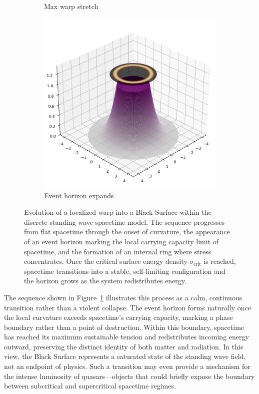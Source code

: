 \documentclass[12pt]{article}
\begin{document}
\begin{figure}[H]
\begin{subfigure}[b]{0.3\textwidth}
    \caption{Max warp stretch}
  \end{subfigure}
  \hfill
  \begin{subfigure}[b]{0.3\textwidth}
    \includegraphics[width=\textwidth]{eh_grows.pdf}
    \caption{Event horizon expands}
  \end{subfigure}

\caption{Evolution of a localized warp into a Black Surface within the discrete standing wave spacetime model. The sequence progresses from flat spacetime through the onset of curvature, the appearance of an event horizon marking the local carrying capacity limit of spacetime, and the formation of an internal ring where stress concentrates. Once the critical surface energy density $\sigma_{\text{crit}}$ is reached, spacetime transitions into a stable, self-limiting configuration and the horizon grows as the system redistributes energy.}
 \label{fig:black_surface_stages}
\end{figure}

\noindent
The sequence shown in Figure~\ref{fig:black_surface_stages} illustrates this process as a calm, continuous transition rather than a violent collapse. The event horizon forms naturally once the local curvature exceeds spacetime’s carrying capacity, marking a phase boundary rather than a point of destruction. Within this boundary, spacetime has reached its maximum sustainable tension and redistributes incoming energy outward, preserving the distinct identity of both matter and radiation. In this view, the Black Surface represents a saturated state of the standing wave field, not an endpoint of physics. Such a transition may even provide a mechanism for the intense luminosity of quasars---objects that could briefly expose the boundary between subcritical and supercritical spacetime regimes.  
\end{document}
